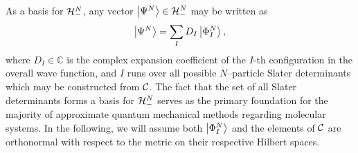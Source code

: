 As a basis for $\mathcal{H}^N_-$, any vector $\left\vert \Psi^N \right\rangle \in \mathcal{H}^N_-$ may be written as \cite{Ostlund12_book}
\begin{equation}
\left\vert \Psi^N \right\rangle = \sum_I D_I \left\vert \Phi^N_I \right\rangle,
\end{equation}
where $D_I\in\mathbb C$ is the complex expansion coefficient of the $I$-th configuration in the overall wave function,
and $I$ runs over all possible $N$--particle Slater determinants which may be constructed from $\mathcal{C}$.
The fact that the set of all Slater determinants forms a basis for $\mathcal{H}^N_-$
serves as the primary foundation for the majority of approximate quantum mechanical methods regarding molecular
systems. In the following, we will assume both $\left\vert \Phi^N_I \right\rangle$ and the elements of $\mathcal{C}$ are orthonormal
with respect to the metric on their respective Hilbert spaces.

